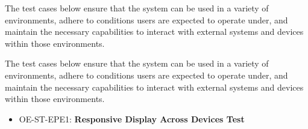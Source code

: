 \documentclass[12pt, titlepage]{article}
\begin{document}
\hspace{2em}The test cases below ensure that the system can be used in a variety of environments,
adhere to conditions users are expected to operate under, and maintain the necessary capabilities
to interact with external systems and devices within those environments.

\hspace{2em}The test cases below ensure that the system can be used in a variety of environments,
adhere to conditions users are expected to operate under, and maintain the necessary capabilities
to interact with external systems and devices within those environments.

\begin{itemize}

  \item OE-ST-EPE1: \textbf{Responsive Display Across Devices Test}


\end{itemize}
\end{document}
